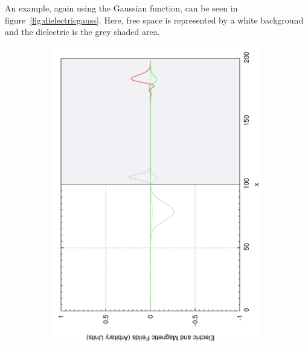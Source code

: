 An example, again using the Gaussian function, can be seen in figure~\ref{fig:dielectricgauss}. Here, free space is represented by a white background and the dielectric is the grey shaded area.
\begin{figure}[ht]
        \centering
        \begin{subfigure}[ht]{0.45\textwidth}
                \centering
                \includegraphics[angle=270, width=\textwidth]{dielectricdouble.pdf}
        \end{subfigure}%
        ~
        \begin{subfigure}[ht]{0.45\textwidth}
                \centering

\end{subfigure}
\end{figure}
